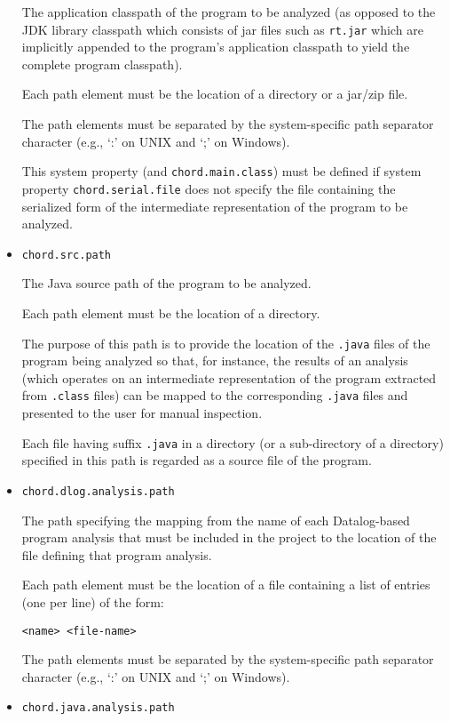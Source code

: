 \documentclass{article}
\begin{document}
\begin{itemize}
The application classpath of the program to be analyzed (as opposed to the
JDK library classpath which consists of jar files such as {\tt rt.jar}
which are implicitly appended to the program's application classpath to
yield the complete program classpath).

Each path element must be the location of a directory or a jar/zip file.

The path elements must be separated by the system-specific path separator character
(e.g., `:' on UNIX and `;' on Windows).

This system property (and {\tt chord.main.class}) must
be defined if system property {\tt chord.serial.file}
does not specify the file containing the serialized form of the intermediate representation
of the program to be analyzed.

\item
{\tt chord.src.path}

The Java source path of the program to be analyzed.

Each path element must be the location of a directory.

The purpose of this path is to provide the location of the
{\tt .java} files of the program being analyzed so that, for instance, the
results of an analysis (which operates on an intermediate representation of the program
extracted from {\tt .class} files) can be mapped to the corresponding {\tt .java}
files and presented to the user for manual inspection.

Each file having suffix {\tt .java} in a directory (or a sub-directory of a directory)
specified in this path is regarded as a source file of the program.

\item
{\tt chord.dlog.analysis.path}

The path specifying the mapping from the name of each Datalog-based program
analysis that must be included in the project to the location
of the file defining that program analysis.

Each path element must be the location of a file containing a
list of entries (one per line) of the form:

{\tt <name> <file-name>}

The path elements must be separated by the system-specific path separator character
(e.g., `:' on UNIX and `;' on Windows).

\item
{\tt chord.java.analysis.path}


\end{itemize}
\end{document}

